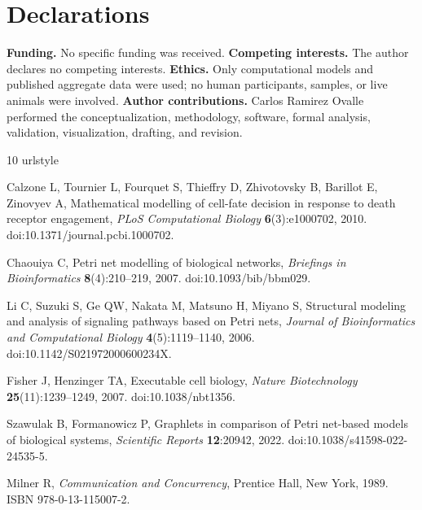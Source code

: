 \documentclass{ws-jbcb}
\numberwithin{equation}{section}
\begin{document}
\section*{Declarations}

\noindent\textbf{Funding.} No specific funding was received.
\textbf{Competing interests.} The author declares no competing interests.
\textbf{Ethics.} Only computational models and published aggregate data were
used; no human participants, samples, or live animals were involved.
\textbf{Author contributions.} Carlos Ramirez Ovalle performed the
conceptualization, methodology, software, formal analysis, validation,
visualization, drafting, and revision.

\begin{thebibliography}{10}
\providecommand{\url}[1]{\texttt{#1}}
\providecommand{\urlprefix}{URL }
\expandafter\ifx\csname urlstyle\endcsname\relax
  \providecommand{\doi}[1]{doi:\discretionary{}{}{}#1}\else
  \providecommand{\doi}{doi:\discretionary{}{}{}\begingroup
  \urlstyle{rm}\Url}\fi

Calzone L, Tournier L, Fourquet S, Thieffry D, Zhivotovsky B, Barillot E,
Zinovyev A, Mathematical modelling of cell-fate decision in response to death
receptor engagement, \emph{PLoS Computational Biology} \textbf{6}(3):e1000702, 2010.
\newblock \doi{10.1371/journal.pcbi.1000702}.

Chaouiya C, Petri net modelling of biological networks, \emph{Briefings in
  Bioinformatics} \textbf{8}(4):210--219, 2007.
\newblock \doi{10.1093/bib/bbm029}.

Li C, Suzuki S, Ge QW, Nakata M, Matsuno H, Miyano S, Structural modeling and
  analysis of signaling pathways based on {Petri} nets, \emph{Journal of
  Bioinformatics and Computational Biology} \textbf{4}(5):1119--1140, 2006.
\newblock \doi{10.1142/S021972000600234X}.

Fisher J, Henzinger TA, Executable cell biology, \emph{Nature Biotechnology}
  \textbf{25}(11):1239--1249, 2007.
\newblock \doi{10.1038/nbt1356}.

Szawulak B, Formanowicz P, Graphlets in comparison of {Petri} net-based models
  of biological systems, \emph{Scientific Reports} \textbf{12}:20942, 2022.
\newblock \doi{10.1038/s41598-022-24535-5}.

Milner R, \emph{Communication and Concurrency}, Prentice Hall, New York, 1989.
\newblock ISBN 978-0-13-115007-2.


\end{thebibliography}
\end{document}
